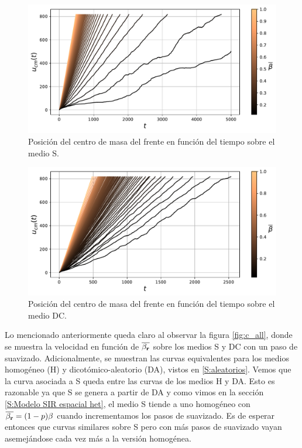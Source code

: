 \begin{figure}[h]
    \centering
    \includegraphics[width=\imsizeL]{ucm_s.pdf}
    \caption{Posición del centro de masa del frente en función del tiempo sobre el medio S.}
    \label{fig:ucm_s}
\end{figure}
\begin{figure}[h]
    \centering
    \includegraphics[width=\imsizeL]{ucm_sd.pdf}
    \caption{Posición del centro de masa del frente en función del tiempo sobre el medio DC.}
    \label{fig:ucm_sd}
\end{figure}

Lo mencionado anteriormente queda claro al observar la figura \ref{fig:c_all}, donde se muestra la velocidad en función de $\overline{\beta_{\vb r}}$ sobre los medios
S y DC con un paso de suavizado. Adicionalmente, se muestran las curvas equivalentes para los medios homogéneo (H) y dicotómico-aleatorio (DA), vistos en \ref{S:aleatorios}. 
Vemos que la curva asociada a S queda entre las curvas de los medios H y DA. Esto es razonable ya que S se genera a partir de DA y como vimos 
en la sección \ref{S:Modelo SIR espacial het}, el medio S tiende a uno homogéneo con $\overline{\beta_{\vb r}}=(1-p)\beta$ cuando incrementamos los pasos de suavizado.
Es de esperar entonces que curvas similares sobre S pero con más pasos de suavizado vayan asemejándose cada vez más a la versión homogénea.

